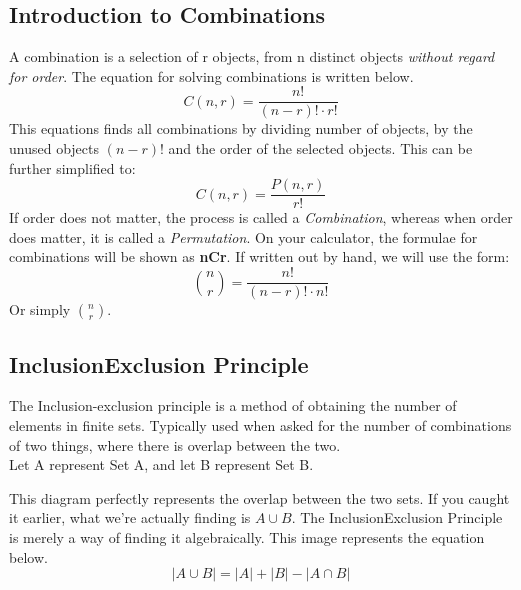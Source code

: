 \documentclass[final,1p,12pt]{elsarticle}
\begin{document}
    \subsection{Introduction to Combinations}
    A combination is a selection of r objects, from n distinct objects \emph{without regard for order}. The equation for solving combinations is written below.
    \begin{equation*}
        C(n,r) = \frac{n!}{(n-r)!\cdot r!}
    \end{equation*}
    This equations finds all combinations by dividing number of objects, by the unused objects $(n-r)!$ and the order of the selected objects. This can be further simplified to:
    \begin{equation*}
        C(n,r) = \frac{P(n,r)}{r!}
    \end{equation*}
    If order does not matter, the process is called a \emph{Combination}, whereas when order does matter, it is called a \emph{Permutation}. On your calculator, the formulae for combinations will be shown as \textbf{nCr}. If written out by hand, we will use the form:
    \begin{equation*}
        \binom{n}{r} = \frac{n!}{(n-r)!\cdot n!}
    \end{equation*}
    Or simply \(\binom{n}{r}\).
    
    \subsection{Inclusion\textemdash Exclusion Principle}
    The Inclusion-exclusion principle is a method of obtaining the number of elements in finite sets. Typically used when asked for the number of combinations of two things, where there is overlap between the two.\\
    Let A represent Set A, and let B represent Set B.
    \begin{center}
    \end{center}
    This diagram perfectly represents the overlap between the two sets. If you caught it earlier, what we're actually finding is $A\cup B$. The Inclusion\textemdash Exclusion Principle is merely a way of finding it algebraically. This image represents the equation below.
    \begin{equation*}
        |A\cup B| = |A| + |B| - |A\cap B|
    \end{equation*}
    
\end{document}
